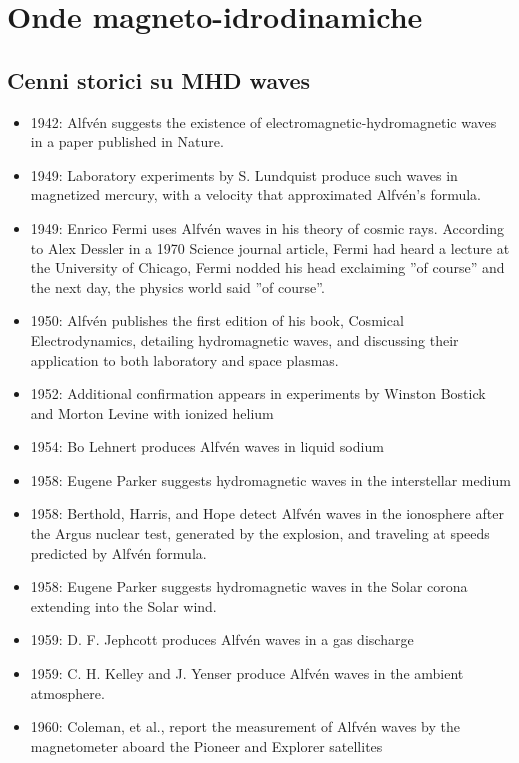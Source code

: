 \documentclass[../main.tex]{subfiles}
\begin{document}
\chapter{Onde magneto-idrodinamiche}
\PartialToc

\section{Cenni storici su MHD waves}

\begin{itemize}
\item 1942: Alfv\'en suggests the existence of electromagnetic-hydromagnetic waves in a paper published in Nature.
\item 1949: Laboratory experiments by S. Lundquist produce such waves in magnetized mercury, with a velocity that approximated Alfvén's formula.
\item 1949: Enrico Fermi uses Alfv\'en waves in his theory of cosmic rays. According to Alex Dessler in a 1970 Science journal article, Fermi had heard a lecture at the University of Chicago, Fermi nodded his head exclaiming ''of course'' and the next day, the physics world said ''of course''.
\item 1950: Alfv\'en publishes the first edition of his book, Cosmical Electrodynamics, detailing hydromagnetic waves, and discussing their application to both laboratory and space plasmas.
\item 1952: Additional confirmation appears in experiments by Winston Bostick and Morton Levine with ionized helium
\item 1954: Bo Lehnert produces Alfv\'en waves in liquid sodium
\item 1958: Eugene Parker suggests hydromagnetic waves in the interstellar medium
\item 1958: Berthold, Harris, and Hope detect Alfv\'en waves in the ionosphere after the Argus nuclear test, generated by the explosion, and traveling at speeds predicted by Alfv\'en formula.
\item 1958: Eugene Parker suggests hydromagnetic waves in the Solar corona extending into the Solar wind.
\item 1959: D. F. Jephcott produces Alfv\'en waves in a gas discharge
\item 1959: C. H. Kelley and J. Yenser produce Alfv\'en waves in the ambient atmosphere.
\item 1960: Coleman, et al., report the measurement of Alfv\'en waves by the magnetometer aboard the Pioneer and Explorer satellites

\end{itemize}
\end{document}
